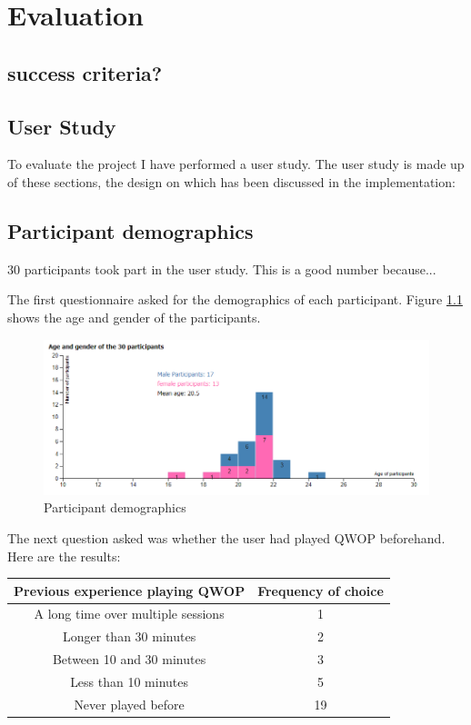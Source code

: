 \documentclass[12pt,a4paper,twoside,openright]{report}
\begin{document}
\chapter{Evaluation}
\section{success criteria?}

\section{User Study}
To evaluate the project I have performed a user study.
The user study is made up of these sections, the design on which has been discussed in the implementation:

\userStudySections

\section{Participant demographics}

30 participants took part in the user study. This is a good number because...


The first questionnaire asked for the demographics of each participant. Figure \ref{demographics} shows the age and gender of the participants.

\begin{figure}[tbh]
\centerline{\includegraphics[scale=0.5]{participantDemographics.PNG}}
\caption{Participant demographics}
\label{demographics}
\end{figure}

The next question asked was whether the user had played QWOP beforehand. Here are the results:


\begin{tabular}{ |c|c| }
  \hline
  Previous experience playing QWOP & Frequency of choice \\ \hline \hline 
  A long time over multiple sessions & 1 \\ \hline
  Longer than 30 minutes & 2 \\ \hline
  Between 10 and 30 minutes & 3 \\ \hline
  Less than 10 minutes & 5 \\ \hline
  Never played before & 19 \\
  \hline
\end{tabular}
\end{document}
